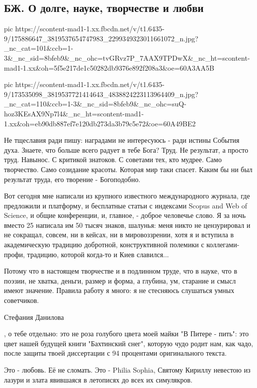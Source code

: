  
 
 
 
 

\subsection{БЖ. О долге, науке, творчестве и любви}


\ifcmt
  pic https://scontent-mad1-1.xx.fbcdn.net/v/t1.6435-9/175886647_3819537654747983_2299349323011661072_n.jpg?_nc_cat=101&ccb=1-3&_nc_sid=8bfeb9&_nc_ohc=tvGRvz7P_7AAX9TPDwX&_nc_ht=scontent-mad1-1.xx&oh=5f5e217de1c50282db9376e892f208a3&oe=60A3AA5B

  pic https://scontent-mad1-1.xx.fbcdn.net/v/t1.6435-9/173535098_3819537721414643_4838824223113964409_n.jpg?_nc_cat=110&ccb=1-3&_nc_sid=8bfeb9&_nc_ohc=suQ-hoz3KEsAX9Np7l4&_nc_ht=scontent-mad1-1.xx&oh=eb90db887ef7e120db273da3b79c5e72&oe=60A49BE2
\fi

Не тщеславия ради пишу: наградами не интересуюсь - ради истины События духа.
Знаете, что больше всего радует в тебе Бога? Труд. Не результат, а просто труд.
Навынос. С критикой знатоков. С советами тех, кто мудрее. Само творчество. Само
созидание красоты. Которая мир таки спасет. Каким бы ни был результат труда,
его творение - Богоподобно.

Вот сегодня мне написали из крупного известного международного журнала, где
предложили и платформу, и бесплатные статьи с индексами Scopus and Web of
Science, и общие конференции, и, главное, - доброе человечье слово. Я за ночь
вместо 25 написала им 50 тысяч знаков, шалунья: меня никто не цензурировал и не
сокращал, совсем, ни в кейсах, ни в мировоззрении, хотя я и вступила в
академическую традицию добротной, конструктивной полемики с коллегами-профи,
традицию, которой когда-то и Киев славился...

Потому что в настоящем творчестве и в подлинном труде, что в науке, что в
поэзии, не хватка, деньги, размер и форма, а глубина, ум, старание и смысл
имеют значение. Правила работу я много: я не стесняюсь слушаться умных
советчиков. 

Стефания Данилова

 , о тебе отдельно: это не роза голубого цвета моей майки "В Питере - пить":
 это цвет нашей будущей книги "Бахтинский снег", которую чудо родит нам, как
 чадо, после защиты твоей диссертации с 94 процентами оригинального текста. 

Это - любовь. Её не сломать. Это - Philia Sophia, Святому Кириллу невестою из
лазури и злата явившаяся в летописях до всех их симулякров.
